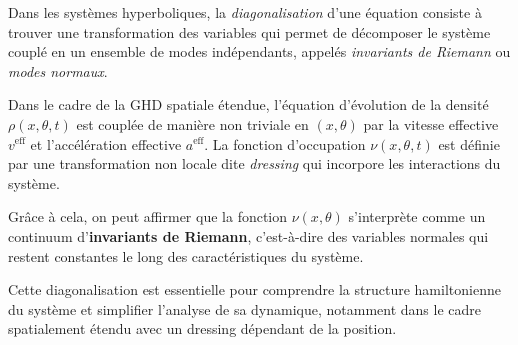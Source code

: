 \medskip

Dans les systèmes hyperboliques, la \emph{diagonalisation} d'une équation consiste à trouver une transformation des variables qui permet de décomposer le système couplé en un ensemble de modes indépendants, appelés \emph{invariants de Riemann} ou \emph{modes normaux}. 

\medskip

Dans le cadre de la GHD spatiale étendue, l'équation d'évolution de la densité \(\rho(x,\theta,t)\) est couplée de manière non triviale en \((x,\theta)\) par la vitesse effective \(v^{\mathrm{eff}}\) et l'accélération effective \(a^{\mathrm{eff}}\). La fonction d'occupation \(\nu(x,\theta,t)\) est définie par une transformation non locale dite \emph{dressing} qui incorpore les interactions du système.

\medskip

Grâce à cela, on peut affirmer que la fonction $\nu (x , \theta)$  s’interprète comme un continuum d’{\bf invariants de Riemann}, c’est-à-dire des variables normales qui restent constantes le long des caractéristiques du système.

\medskip

Cette diagonalisation est essentielle pour comprendre la structure hamiltonienne du système et simplifier l'analyse de sa dynamique, notamment dans le cadre spatialement étendu avec un dressing dépendant de la position. 






 






